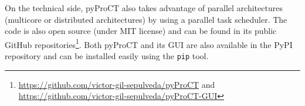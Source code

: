 On the technical side, pyProCT also takes advantage of parallel architectures (multicore or distributed architectures) by using a parallel task scheduler. The code is also open source (under MIT license) and can be found in its public GitHub repositories\footnote{\url{https://github.com/victor-gil-sepulveda/pyProCT} and \url{https://github.com/victor-gil-sepulveda/pyProCT-GUI}}. Both pyProCT and its GUI are also available in the PyPI repository and can be installed easily using the \texttt{pip} tool.

\newpage
